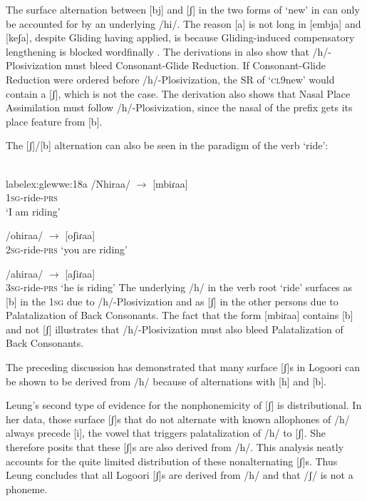 \documentclass[output=paper]{langsci/langscibook}
\begin{document}
The surface alternation between [bj] and [ʃ] in the two forms of ‘new’ in  can only be accounted for by an underlying /hi/. The reason [a] is not long in [embja] and [keʃa], despite Gliding having applied, is because Gliding-induced compensatory lengthening is blocked wordfinally \citep{Leung1991}. The derivations in  also show that /h/-Plosivization must bleed Consonant-Glide Reduction. If Consonant-Glide Reduction were ordered before /h/-Plosivization, the SR of ‘\textsc{cl}9new’ would contain a [ʃ], which is not the case. The derivation also shows that Nasal Place Assimilation must follow /h/-Plosivization, since the nasal of the prefix gets its place feature from [b].

The [ʃ]/[b] alternation can also be seen in the paradigm of the verb ‘ride’:


\ea\label{ex:glewwe:18}{}
   \ea\\label{ex:glewwe:18a}
 /Nhiraa/  $\rightarrow$  [mbiɾaa]\\{}
\textsc{1sg}-ride-\textsc{prs}\\{}
\glt ‘I am riding’

\ex\label{ex:glewwe:18b}{}
 /ohiraa/  $\rightarrow$  \textsc{[}oʃiɾaa]\\{}
\textsc{2sg}-ride-\textsc{prs}
\glt ‘you are riding’  

\ex\label{ex:glewwe:18c}{}
 /ahiraa/  $\rightarrow$  [aʃiɾaa]  \\{}
\textsc{3sg}-ride-\textsc{prs}
\glt ‘he is riding’
\z
\z 
The underlying /h/ in the verb root ‘ride’ surfaces as [b] in the 1\textsc{sg} due to /h/-Plosivization and as [ʃ] in the other persons due to Palatalization of Back Consonants. The fact that the form [mbiɾaa] contains [b] and not [ʃ] illustrates that /h/-Plosivization must also bleed Palatalization of Back Consonants. 

The preceding discussion has demonstrated that many surface [ʃ]s in Logoori can be shown to be derived from /h/ because of alternations with [h] and [b]. 

Leung’s second type of evidence for the nonphonemicity of [ʃ] is distributional. In her data, those surface [ʃ]s that do not alternate with known allophones of /h/ always precede [i], the vowel that triggers palatalization of /h/ to [ʃ]. She therefore posits that these [ʃ]s are also derived from /h/. This analysis neatly accounts for the quite limited distribution of these nonalternating [ʃ]s. Thus Leung concludes that all Logoori [ʃ]s are derived from /h/ and that /ʃ/ is not a phoneme.
\end{document}
